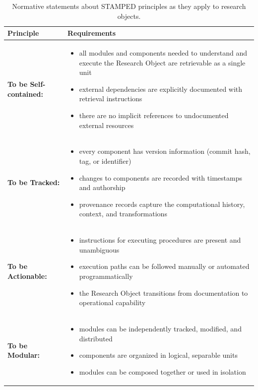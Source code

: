 \documentclass{article}
\begin{document}
\begin{table}[htbp]
\centering
\caption{Normative statements about STAMPED principles as they apply to research objects.}
\begin{tabular}{|l|p{}|}
\hline
\textbf{Principle} & \textbf{Requirements} \\
\hline
\textbf{To be Self-contained:} &
\begin{itemize}[noitemsep,topsep=0pt,leftmargin=*]
  \item all modules and components needed to understand and execute the Research Object are retrievable as a single unit
  \item external dependencies are explicitly documented with retrieval instructions
  \item there are no implicit references to undocumented external resources
\end{itemize} \\
\hline
\textbf{To be Tracked:} &
\begin{itemize}[noitemsep,topsep=0pt,leftmargin=*]
  \item every component has version information (commit hash, tag, or identifier)
  \item changes to components are recorded with timestamps and authorship
  \item provenance records capture the computational history, context, and transformations
\end{itemize} \\
\hline
\textbf{To be Actionable:} &
\begin{itemize}[noitemsep,topsep=0pt,leftmargin=*]
  \item instructions for executing procedures are present and unambiguous
  \item execution paths can be followed manually or automated programmatically
  \item the Research Object transitions from documentation to operational capability
\end{itemize} \\
\hline
\textbf{To be Modular:} &
\begin{itemize}[noitemsep,topsep=0pt,leftmargin=*]
  \item modules can be independently tracked, modified, and distributed
  \item components are organized in logical, separable units
  \item modules can be composed together or used in isolation
\end{itemize} \\

\end{tabular}
\end{table}
\end{document}
